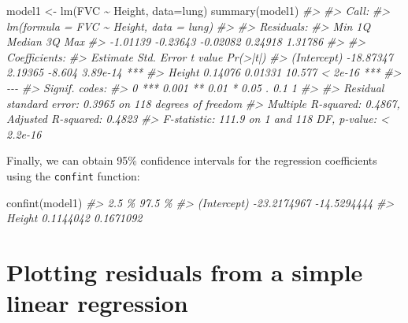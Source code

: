\documentclass[
]{memoir}
\newenvironment{Shaded}{\begin{snugshade}}{\end{snugshade}}
\newcommand{\AttributeTok}[1]{\textcolor[rgb]{0.77,0.63,0.00}{#1}}
\newcommand{\CommentTok}[1]{\textcolor[rgb]{0.56,0.35,0.01}{\textit{#1}}}
\newcommand{\FunctionTok}[1]{\textcolor[rgb]{0.00,0.00,0.00}{#1}}
\newcommand{\NormalTok}[1]{#1}
\newcommand{\OtherTok}[1]{\textcolor[rgb]{0.56,0.35,0.01}{#1}}
\newcommand{\SpecialCharTok}[1]{\textcolor[rgb]{0.00,0.00,0.00}{#1}}
\begin{document}
\begin{Shaded}
\begin{Highlighting}[]
\NormalTok{model1 }\OtherTok{\textless{}{-}} \FunctionTok{lm}\NormalTok{(FVC }\SpecialCharTok{\textasciitilde{}}\NormalTok{ Height, }\AttributeTok{data=}\NormalTok{lung)}
\FunctionTok{summary}\NormalTok{(model1)}
\CommentTok{\#\textgreater{} }
\CommentTok{\#\textgreater{} Call:}
\CommentTok{\#\textgreater{} lm(formula = FVC \textasciitilde{} Height, data = lung)}
\CommentTok{\#\textgreater{} }
\CommentTok{\#\textgreater{} Residuals:}
\CommentTok{\#\textgreater{}      Min       1Q   Median       3Q      Max }
\CommentTok{\#\textgreater{} {-}1.01139 {-}0.23643 {-}0.02082  0.24918  1.31786 }
\CommentTok{\#\textgreater{} }
\CommentTok{\#\textgreater{} Coefficients:}
\CommentTok{\#\textgreater{}              Estimate Std. Error t value Pr(\textgreater{}|t|)    }
\CommentTok{\#\textgreater{} (Intercept) {-}18.87347    2.19365  {-}8.604 3.89e{-}14 ***}
\CommentTok{\#\textgreater{} Height        0.14076    0.01331  10.577  \textless{} 2e{-}16 ***}
\CommentTok{\#\textgreater{} {-}{-}{-}}
\CommentTok{\#\textgreater{} Signif. codes:  }
\CommentTok{\#\textgreater{} 0 \textquotesingle{}***\textquotesingle{} 0.001 \textquotesingle{}**\textquotesingle{} 0.01 \textquotesingle{}*\textquotesingle{} 0.05 \textquotesingle{}.\textquotesingle{} 0.1 \textquotesingle{} \textquotesingle{} 1}
\CommentTok{\#\textgreater{} }
\CommentTok{\#\textgreater{} Residual standard error: 0.3965 on 118 degrees of freedom}
\CommentTok{\#\textgreater{} Multiple R{-}squared:  0.4867, Adjusted R{-}squared:  0.4823 }
\CommentTok{\#\textgreater{} F{-}statistic: 111.9 on 1 and 118 DF,  p{-}value: \textless{} 2.2e{-}16}
\end{Highlighting}
\end{Shaded}

Finally, we can obtain 95\% confidence intervals for the regression coefficients using the \texttt{confint} function:

\begin{Shaded}
\begin{Highlighting}[]
\FunctionTok{confint}\NormalTok{(model1)}
\CommentTok{\#\textgreater{}                   2.5 \%      97.5 \%}
\CommentTok{\#\textgreater{} (Intercept) {-}23.2174967 {-}14.5294444}
\CommentTok{\#\textgreater{} Height        0.1144042   0.1671092}
\end{Highlighting}
\end{Shaded}

\hypertarget{plotting-residuals-from-a-simple-linear-regression}{%
\section{Plotting residuals from a simple linear regression}\label{plotting-residuals-from-a-simple-linear-regression}}
\end{document}
